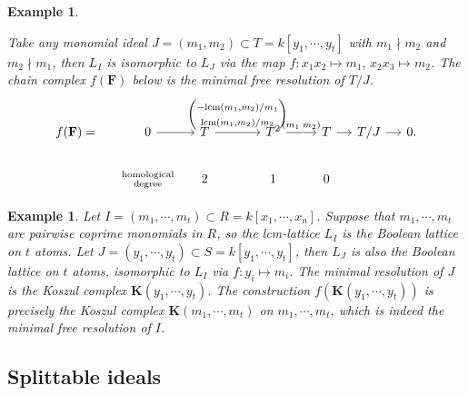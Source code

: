 \documentclass[dvipsnames,10pt]{article}
\newtheorem{example}[theorem]{Example}
\begin{document}
\begin{example}
\begin{center}

    \end{center}
    Take any monomial ideal $J=(m_1,m_2)\subset T=k[y_1,\cdots,y_t]$ with $m_1\nmid m_2$ and $m_2\nmid m_1$, then $L_I$ is isomorphic to $L_J$ via the map $f:x_1x_2\mapsto m_1,\,x_2x_3\mapsto m_2$. The chain complex $f(\mathbf{F})$ below is the minimal free resolution of $T/J$.
    \begin{equation*}
        \begin{tikzcd}[ampersand replacement=\&,column sep=small]
            f(\mathbf{F})= \& 0 \arrow[r] \& T \arrow[rrr, "{
                \begin{pmatrix}
                    -\mathrm{lcm}(m_1,m_2)/m_1 \\
                    \mathrm{lcm}(m_1,m_2)/m_2
                \end{pmatrix}
            }"] \&\&\& T^2 \arrow[rr, "{
                (m_1 \; m_2)
            }"] \&\& T \arrow[r] \& T/J \arrow[r] \& 0.\\
            \& \substack{\text{homological} \\ \text{degree}}\& 2 \&\&\& 1 \&\& 0 \& \&
        \end{tikzcd}
    \end{equation*}
\end{example}

\begin{example}
Let $I=(m_1,\cdots,m_t)\subset R=k[x_1,\cdots,x_n]$. Suppose that $m_1,\cdots,m_t$ are pairwise coprime monomials in $R$, so the lcm-lattice $L_I$ is the Boolean lattice on $t$ atoms. Let $J=(y_1,\cdots,y_t)\subset S=k[y_1,\cdots,y_t]$, then $L_J$ is also the Boolean lattice on $t$ atoms, isomorphic to $L_I$ via $f:y_i\mapsto m_i$. The minimal resolution of $J$ is the Koszul complex $\mathbf{K}(y_1,\cdots,y_t)$. The construction $f(\mathbf{K}(y_1,\cdots,y_t))$ is precisely the Koszul complex $\mathbf{K}(m_1,\cdots,m_t)$ on $m_1,\cdots,m_t$, which is indeed the minimal free resolution of $I$.
\end{example}

\subsection{Splittable ideals} \label{splittable}
\end{document}
